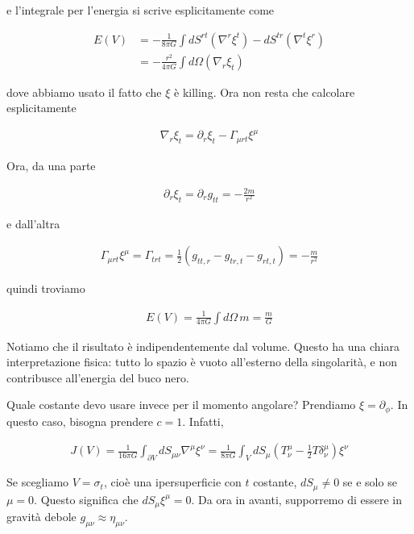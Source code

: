 \documentclass{report}
\begin{document}
{    e l'integrale per l'energia si scrive esplicitamente come 

    \begin{align}
        E(V) &= -\frac{1}{8\pi G}\int dS^{rt}(\nabla^r \xi^t) - dS^{tr}(\nabla^t \xi^r) \\
        &= -\frac{r^2}{4\pi G} \int d\Omega (\nabla_r \xi_t)
    \end{align}
    
    dove abbiamo usato il fatto che \(\xi\) è killing. Ora non resta che calcolare esplicitamente 

    \begin{align}
        \nabla_r \xi_t = \partial_r \xi_t - \Gamma_{\mu rt}\xi^\mu
    \end{align}

    Ora, da una parte 

    \begin{align}
        \partial_r \xi_t = \partial_r g_{tt} = -\frac{2m}{r^2}
    \end{align}

    e dall'altra 

    \begin{align}
        \Gamma_{\mu rt}\xi^\mu = \Gamma_{trt} = \frac{1}{2}(g_{tt, r} - g_{tr, t} - g_{rt, t}) = -\frac{m}{r^2}
    \end{align}

    quindi troviamo 

    \begin{align}
        E(V) = \frac{1}{4\pi G} \int d\Omega \, m = \frac{m}{G}
    \end{align}

    Notiamo che il risultato è indipendentemente dal volume. Questo ha una chiara interpretazione fisica: tutto lo spazio è vuoto all'esterno della singolarità, e non contribusce all'energia del buco nero. 
}



Quale costante devo usare invece per il momento angolare? Prendiamo \(\xi = \partial_\phi\). In questo caso, bisogna prendere \(c=1\). Infatti,

    \begin{align}
        J(V) = \frac{1}{16\pi G}\int_{\partial V}dS_{\mu\nu}\nabla^\mu \xi^\nu = \frac{1}{8\pi G}\int_V dS_\mu (T^\mu_\nu - \frac{1}{2}T\delta^\mu_\nu)\xi^\nu
    \end{align}

    Se scegliamo \(V = \sigma_t\), cioè una ipersuperficie con \(t\) costante, \(dS_\mu \neq 0\) se e solo se \(\mu = 0\). Questo significa che \(dS_\mu \xi^\mu = 0\). Da ora in avanti, supporremo di essere in gravità debole \(g_{\mu\nu} \approx \eta_{\mu\nu}\). \\
\end{document}
